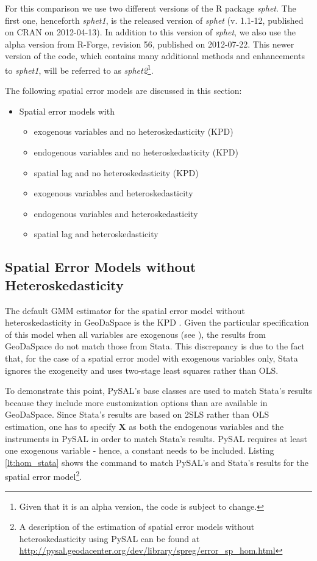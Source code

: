\documentclass{article}
\begin{document}
For this comparison we use two different versions of the R package \emph{sphet}. The first one, henceforth \emph{sphet1}, is the released version of \emph{sphet} (v. 1.1-12, published on CRAN on 2012-04-13). In addition to this version of \emph{sphet}, we also use the alpha version from R-Forge, revision 56, published on 2012-07-22. This newer version of the code, which contains many additional methods and enhancements to \emph{sphet1}, will be referred to as \emph{sphet2}\footnote{Given that it is an alpha version, the code is subject to change.}.


The following spatial error models are discussed in this section:

\begin{itemize}
\item Spatial error models with 
	\begin{itemize}
	\item exogenous variables and no heteroskedasticity (KPD)
	\item endogenous variables and no heteroskedasticity (KPD)
	\item spatial lag and no heteroskedasticity (KPD)
	\item exogenous variables and heteroskedasticity
	\item endogenous variables and heteroskedasticity
	\item spatial lag and heteroskedasticity
	\end{itemize}
\end{itemize}

\subsection{Spatial Error Models without Heteroskedasticity}

The default GMM estimator for the spatial error model without heteroskedasticity in GeoDaSpace is the KPD \citep{Drukker10}. Given the particular specification of this model when all variables are exogenous (see \citet{Anselin11}), the results from GeoDaSpace do not match those from Stata. This discrepancy is due to the fact that, for the case of a spatial error model with exogenous variables only, Stata ignores the exogeneity and uses two-stage least squares rather than OLS.

To demonstrate this point, PySAL's base classes are used to match Stata's results because they include more customization options than are available in GeoDaSpace. Since Stata's results are based on 2SLS rather than OLS estimation, one has to specify $\mathbf{X}$ as both the endogenous variables and the instruments in PySAL in order to match Stata's results. PySAL requires at least one exogenous variable - hence, a constant needs to be included. Listing \ref{lt:hom_stata} shows the command to match PySAL's and Stata's results for the spatial error model\footnote{A description of the estimation of spatial error models without heteroskedasticity using PySAL can be found at \url{http://pysal.geodacenter.org/dev/library/spreg/error_sp_hom.html}}. 
\end{document}
